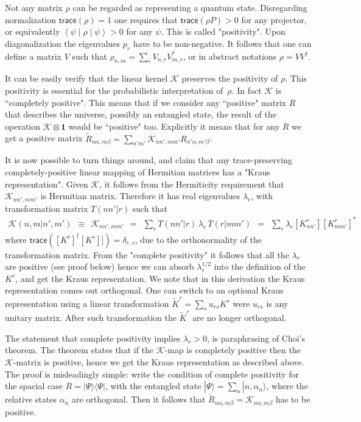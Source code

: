 \documentclass[onecolumn,fleqn, 11pt]{revtex4}
\newcommand{\trc}{\mathsf{trace}}
\newcommand{\BraKet}[3]{\left\langle #1 \middle| #2 \middle| #3 \right\rangle}
\newcommand{\beq}{\begin{eqnarray}}
\newcommand{\eeq}{\end{eqnarray}}
\begin{document}
Not any matrix $\rho$ can be regarded as representing a quantum state. 
Disregarding normalization ${\trc(\rho)=1}$ one requires that ${\trc(\rho P)>0}$ for any projector, 
or equivalently ${\BraKet{\psi}{\rho}{\psi}>0}$ for any $\psi$.
This is called "positivity". Upon diagonalization the eigenvalues $p_r$ have to be non-negative. 
It follows that one can define a matrix $V$ such that ${\rho_{n,m} = \sum_r V_{n,r} V_{m,r}^*}$, 
or in abstract notations ${\rho = VV^{\dag}}$.          


It can be easily verify that the linear kernel $\mathcal{K}$ preserves the positivity of $\rho$. 
This positivity is essential for the probabilistic interpretation of~$\rho$. 
In fact $\mathcal{K}$ is ``completely positive". 
This means that if we consider any ``positive" matrix $R$ that describes the universe, 
possibly an entangled state, the result of the operation ${\mathcal{K} \otimes \bm{1}}$ 
would be ``positive" too. Explicitly it means that for any $R$ we get  
a positive matrix ${\tilde{R}_{n\alpha,m\beta} = \sum_{n'm'} \mathcal{K}_{nn',mm'} R_{n'\alpha,m'\beta}}$.


It is now possible to turn things around, and claim 
that any trace-preserving completely-positive linear mapping
of Hermitian matrices has a "Kraus representation". 
Given $\mathcal{K}$, it follows from the Hermiticity 
requirement that ${\mathcal{K}_{nn',mm'}}$ is Hermitian matrix. 
Therefore it has real eigenvalues $\lambda_r$, 
with transformation matrix $T(nn'|r)$ such that   
\beq
\mathcal{K}(n,m|n',m') \ \ \equiv \ \  \mathcal{K}_{nn',mm'}
\ \ = \ \ \sum_r  T(nn'|r) \, \lambda_r \, T(r|mm')
\ \ = \ \ \sum_r  \lambda_r [K^r_{nn'}] [K^r_{mm'}]^*
\eeq
where $\trc([K^r]^{\dag}[K^s]])=\delta_{r,s}$, 
due to the orthonormality of the transformation matrix. 
From the "complete positivity" it follows that all the $\lambda_r$ 
are positive (see proof below) hence we can absorb $\lambda_r^{1/2}$
into the definition of the $K^r$, and get the Kraus representation. 
We note that in this derivation the Kraus representation comes  
out orthogonal. One can switch to an optional Kraus representation 
using a linear transformation ${\tilde{K}^r = \sum_{s} u_{rs} K^s}$  
were $u_{rs}$ is any unitary matrix. After such transformation 
the $\tilde{K}^r$ are no longer orthogonal. 


The statement that complete positivity implies ${\lambda_r>0}$,  
is paraphrasing of Choi's theorem. The theorem states 
that if the $\mathcal{K}$-map is completely positive
then the $\mathcal{K}$-matrix is positive, 
hence we get the Kraus representation as described above.
The proof is misleadingly simple: write the condition of 
complete positivity for the spacial case ${R = |\Psi\rangle \langle \Psi| }$, 
with the entangled state ${|\Psi\rangle = \sum_n |n,\alpha_n \rangle }$, 
where the relative states ${\alpha_n}$ are orthogonal. 
Then it follows that ${\tilde{R}_{n\alpha,m\beta} = \mathcal{K}_{n\alpha,m\beta}}$ 
has to be positive.      
  
\end{document}
